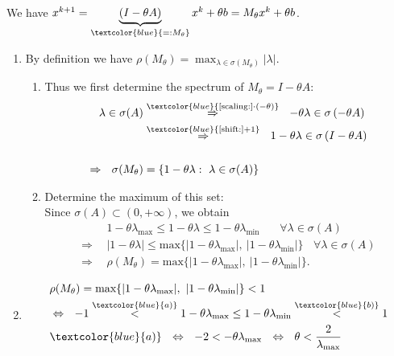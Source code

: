 {\color{solution}
We have $x^{k+1}=\underbrace{(I-\theta A)}_{\textcolor{blue}{=:M_\theta}}x^k+\theta b = M_\theta x^k+\theta b $.
\begin{enumerate}
	\item %
	By definition we have $\rho(M_\theta)=\max_{\lambda\in\sigma(M_\theta)}|\lambda|$.
	\begin{enumerate}
		\item 
		Thus we first determine the spectrum of $M_\theta = I-\theta A$:
		\begin{align*}
		\lambda\in\sigma(A)
		&\stackrel{\textcolor{blue}{\text{[scaling:]}\cdot(-\theta)}}{\Rightarrow}~~
		-\theta\lambda\in\sigma\left(-\theta A\right)\\
		&\stackrel{\textcolor{blue}{\text{[shift:]} +1}}{\Rightarrow}~~
		1-\theta\lambda\in\sigma\left(I-\theta A\right)\\
		\\
		\Rightarrow~~\sigma(M_\theta)&=\{1-\theta\lambda:~\lambda\in\sigma(A)\}
		\end{align*}
		\item 
		Determine the maximum of this set:\\
		Since $\sigma(A)\subset(0,+\infty)$, we obtain
		\begin{align*}
		&1-\theta\lambda_{\text{max}}\leq 1-\theta\lambda\leq 1-\theta\lambda_{\text{min}}~~~~~~~~\forall\lambda\in\sigma(A)\\
		\Rightarrow~~&|1-\theta\lambda|\leq\text{max}\{|1-\theta\lambda_{\text{max}}|,~|1-\theta\lambda_{\text{min}}|\}~~~~\forall\lambda\in\sigma(A)\\
		\Rightarrow~~&\rho(M_\theta)=\text{max}\{|1-\theta\lambda_{\text{max}}|,~|1-\theta\lambda_{\text{min}}|\}.
		\end{align*}
	\end{enumerate}
	\item 
	\begin{align*}
	&\rho(M_\theta)=\text{max}\{|1-\theta\lambda_{\text{max}}|,~|1-\theta\lambda_{\text{min}}|\}<1\\
	&\Leftrightarrow~~-1\stackrel{\textcolor{blue}{a)}}{<}1-\theta\lambda_{\text{max}}\leq 1-\theta\lambda_{\text{min}}\stackrel{\textcolor{blue}{b)}}{<}1\\
	&\textcolor{blue}{a)}~~\Leftrightarrow~~-2<-\theta\lambda_{\text{max}}~~\Leftrightarrow~~\theta<\frac{2}{\lambda_{\text{max}}}\\

\end{align*}
\end{enumerate}}
